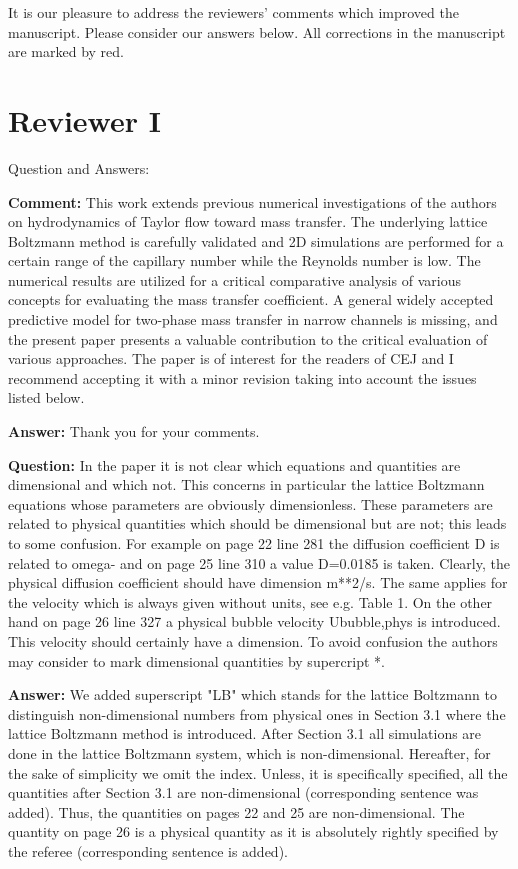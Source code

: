 \documentclass{article}
\begin{document}
It is our pleasure to address the reviewers' comments which improved the manuscript.  Please consider our answers below. All corrections in the manuscript are marked by red.
\section{Reviewer I}

Question and Answers:

\textbf{Comment:}
This work extends previous numerical investigations of the authors on hydrodynamics of Taylor flow toward mass transfer. The underlying lattice Boltzmann method is carefully validated and 2D simulations are performed for a certain range of the capillary number while the Reynolds number is low. The numerical results are utilized for a critical comparative analysis of various concepts for evaluating the mass transfer coefficient. A general widely accepted predictive model for two-phase mass transfer in narrow channels is missing, and the present paper presents a valuable contribution to the critical evaluation of various approaches. The paper is of interest for the readers of CEJ and I recommend accepting it with a minor revision taking into account the issues listed below.

\textbf{Answer:} Thank you for your comments.

\textbf{Question:}  In the paper it is not clear which equations and quantities are dimensional and which not. This concerns in particular the lattice Boltzmann equations whose parameters are obviously dimensionless. These parameters are related to physical quantities which should be dimensional but are not; this leads to some confusion. For example on page 22 line 281 the diffusion coefficient D is related to omega- and on page 25 line 310 a value D=0.0185 is taken. Clearly, the physical diffusion coefficient should have dimension m**2/s. The same applies for the velocity which is always given without units, see e.g. Table 1. On the other hand on page 26 line 327 a physical bubble velocity Ububble,phys is introduced. This velocity should certainly have a dimension. To avoid confusion the authors may consider to mark dimensional quantities by supercript *.

\textbf{Answer:}  We added superscript "LB" which stands for the lattice Boltzmann to distinguish non-dimensional numbers from physical ones in Section 3.1 where the lattice Boltzmann method is introduced. After Section 3.1 all simulations are done in the lattice Boltzmann system, which is non-dimensional. Hereafter, for the sake of simplicity we omit the index. Unless, it is specifically specified, all the quantities after Section 3.1 are non-dimensional (corresponding sentence was added). Thus, the quantities on pages 22 and 25 are non-dimensional. The quantity on page 26 is a physical quantity as it is absolutely rightly specified by the referee (corresponding sentence is added).
\end{document}
